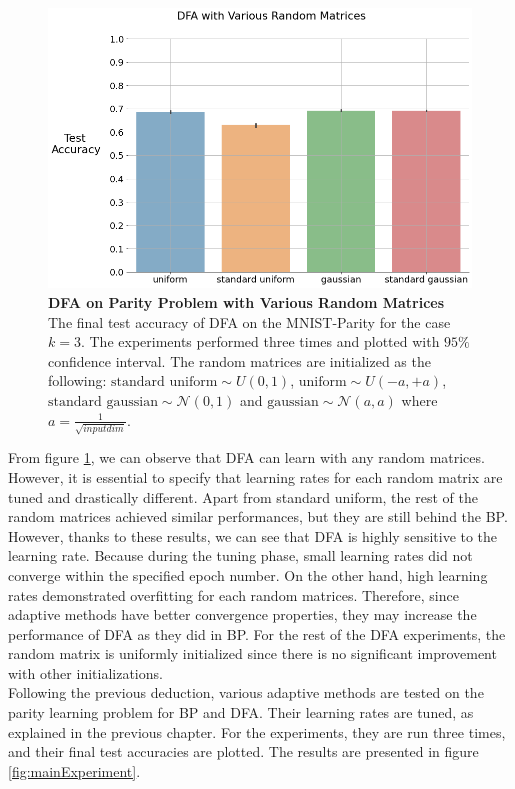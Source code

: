 \documentclass[a4paper, nobind]{templates/ociamthesis}
\begin{document}
\begin{figure}

{\centering \includegraphics[width=1\linewidth]{figures/3_k3_DFA_RandomMatrices} 

}

\caption[DFA on MNIST-Parity Problem with Various Random Matrices]{\textbf{DFA on Parity Problem with Various Random Matrices} \newline The final test accuracy of DFA on the MNIST-Parity for the case $k=3$. The experiments performed three times and plotted with $95\%$ confidence interval. The random matrices are initialized as the following: $\text{standard uniform} \sim U(0,1)$, $\text{uniform} \sim U(-a,+a)$, $\text{standard gaussian} \sim \mathcal{N}\left(0, 1\right)$ and $\text{gaussian} \sim \mathcal{N}\left(a, a \right)$ where $a= \frac{1}{\sqrt{input dim}}$.}\label{fig:DFARandomMatrices}
\end{figure}

\noindent From figure \ref{fig:DFARandomMatrices}, we can observe that DFA can learn with any random matrices. However, it is essential to specify that learning rates for each random matrix are tuned and drastically different. Apart from standard uniform, the rest of the random matrices achieved similar performances, but they are still behind the BP. However, thanks to these results, we can see that DFA is highly sensitive to the learning rate. Because during the tuning phase, small learning rates did not converge within the specified epoch number. On the other hand, high learning rates demonstrated overfitting for each random matrices. Therefore, since adaptive methods have better convergence properties, they may increase the performance of DFA as they did in BP. For the rest of the DFA experiments, the random matrix is uniformly initialized since there is no significant improvement with other initializations.\\
\noindent Following the previous deduction, various adaptive methods are tested on the parity learning problem for BP and DFA. Their learning rates are tuned, as explained in the previous chapter. For the experiments, they are run three times, and their final test accuracies are plotted. The results are presented in figure \ref{fig:mainExperiment}.
\end{document}
